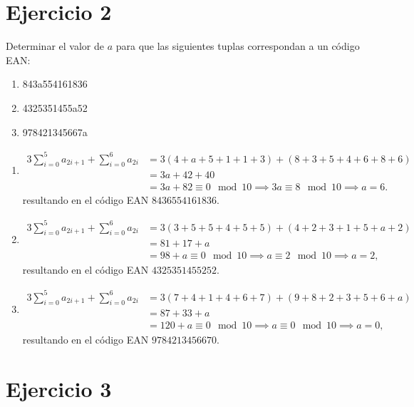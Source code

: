 \section{Ejercicio 2}

\begin{formulationBox}
	Determinar el valor de $a$ para que las siguientes tuplas correspondan a un código EAN:
	\begin{enumerate}[label=\alph*)]
		\item 843a554161836
		\item 4325351455a52
		\item 978421345667a
	\end{enumerate}
\end{formulationBox}

\begin{enumerate}[label=\alph*)]
	\item
	\begin{align*}
		3\sum_{i=0}^5a_{2i+1} + \sum_{i=0}^6a_{2i} & = 3(4+a+5+1+1+3) + (8+3+5+4+6+8+6)\\
		&= 3a + 42 + 40\\
		&= 3a + 82 \equiv 0 \mod 10 \implies 3a \equiv 8 \mod 10 \implies a = 6.
	\end{align*}
	resultando en el código EAN $8436554161836$.
	
	\item
	\begin{align*}
		3\sum_{i=0}^5a_{2i+1} + \sum_{i=0}^6a_{2i} & = 3(3+5+5+4+5+5) + (4+2+3+1+5+a+2)\\
		&= 81 + 17 + a\\
		&= 98 + a \equiv 0 \mod 10 \implies a \equiv 2 \mod 10 \implies a = 2,
	\end{align*}
	resultando en el código EAN $4325351455252$.
	
	\item
	\begin{align*}
		3\sum_{i=0}^5a_{2i+1} + \sum_{i=0}^6a_{2i} & = 3(7+4+1+4+6+7) + (9+8+2+3+5+6+a)\\
		&= 87 + 33 + a\\
		&= 120 + a \equiv 0 \mod 10 \implies a \equiv 0 \mod 10 \implies a = 0,
	\end{align*}
	resultando en el código EAN $9784213456670$.
\end{enumerate}

\section{Ejercicio 3}

